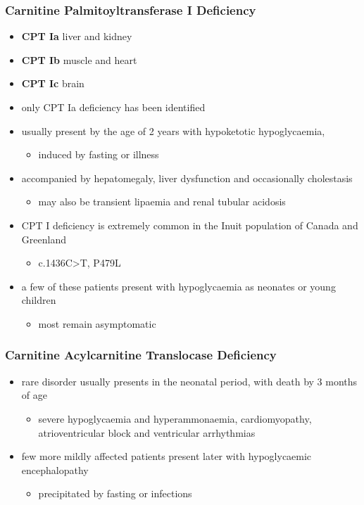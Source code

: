 \documentclass{scrartcl}
\begin{document}
\subsubsection{Carnitine Palmitoyltransferase I Deficiency}
\label{sec:org1fa55f0}
\begin{itemize}
\item \textbf{CPT Ia} liver and kidney
\item \textbf{CPT Ib}  muscle and heart
\item \textbf{CPT Ic}  brain

\item only CPT Ia deficiency has been identified
\item usually present by the age of 2 years with hypoketotic hypoglycaemia,
\begin{itemize}
\item induced by fasting or illness
\end{itemize}
\item accompanied by hepatomegaly, liver dysfunction and occasionally cholestasis
\begin{itemize}
\item may also be transient lipaemia and renal tubular acidosis
\end{itemize}
\item CPT I deficiency is extremely common in the Inuit population of Canada and Greenland
\begin{itemize}
\item c.1436C>T, P479L
\end{itemize}
\item a few of these patients present with hypoglycaemia as neonates or young children
\begin{itemize}
\item most remain asymptomatic
\end{itemize}
\end{itemize}

\subsubsection{Carnitine Acylcarnitine Translocase Deficiency}
\label{sec:org63e895c}

\begin{itemize}
\item rare disorder usually presents in the neonatal period, with
death by 3 months of age
\begin{itemize}
\item severe hypoglycaemia and hyperammonaemia, cardiomyopathy,
atrioventricular block and ventricular arrhythmias
\end{itemize}
\item few more mildly affected patients present later with hypoglycaemic
encephalopathy
\begin{itemize}
\item precipitated by fasting or infections
\end{itemize}
\end{itemize}
\end{document}

